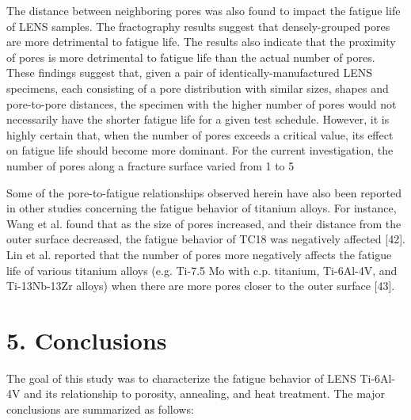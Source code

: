 \documentclass[10pt]{article}
\begin{document}
The distance between neighboring pores was also found to impact the fatigue life of LENS samples. The fractography results suggest that densely-grouped pores are more detrimental to fatigue life. The results also indicate that the proximity of pores is more detrimental to fatigue life than the actual number of pores. These findings suggest that, given a pair of identically-manufactured LENS specimens, each consisting of a pore distribution with similar sizes, shapes and pore-to-pore distances, the specimen with the higher number of pores would not necessarily have the shorter fatigue life for a given test schedule. However, it is highly certain that, when the number of pores exceeds a critical value, its effect on fatigue life should become more dominant. For the current investigation, the number of pores along a fracture surface varied from 1 to 5

Some of the pore-to-fatigue relationships observed herein have also been reported in other studies concerning the fatigue behavior of titanium alloys. For instance, Wang et al. found that as the size of pores increased, and their distance from the outer surface decreased, the fatigue behavior of TC18 was negatively affected [42]. Lin et al. reported that the number of pores more negatively affects the fatigue life of various titanium alloys (e.g. Ti-7.5 Mo with c.p. titanium, Ti-6Al-4V, and Ti-13Nb-13Zr alloys) when there are more pores closer to the outer surface [43].

\section*{5. Conclusions}
The goal of this study was to characterize the fatigue behavior of LENS Ti-6Al-4V and its relationship to porosity, annealing, and heat treatment. The major conclusions are summarized as follows:
\end{document}
